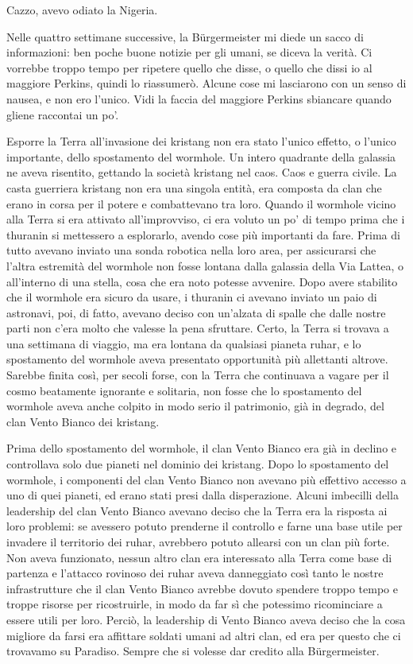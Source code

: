 Cazzo, avevo odiato la Nigeria.

\hfill\break

Nelle quattro settimane successive, la Bürgermeister mi diede un sacco
di informazioni: ben poche buone notizie per gli umani, se diceva la
verità. Ci vorrebbe troppo tempo per ripetere quello che disse, o quello
che dissi io al maggiore Perkins, quindi lo riassumerò. Alcune cose mi
lasciarono con un senso di nausea, e non ero l'unico. Vidi la faccia del
maggiore Perkins sbiancare quando gliene raccontai un po'.

Esporre la Terra all'invasione dei kristang non era stato l'unico
effetto, o l'unico importante, dello spostamento del wormhole. Un intero
quadrante della galassia ne aveva risentito, gettando la società
kristang nel caos. Caos e guerra civile. La casta guerriera kristang non
era una singola entità, era composta da clan che erano in corsa per il
potere e combattevano tra loro. Quando il wormhole vicino alla Terra si
era attivato all'improvviso, ci era voluto un po' di tempo prima che i
thuranin si mettessero a esplorarlo, avendo cose più importanti da fare.
Prima di tutto avevano inviato una sonda robotica nella loro area, per
assicurarsi che l'altra estremità del wormhole non fosse lontana dalla
galassia della Via Lattea, o all'interno di una stella, cosa che era
noto potesse avvenire. Dopo avere stabilito che il wormhole era sicuro
da usare, i thuranin ci avevano inviato un paio di astronavi, poi, di
fatto, avevano deciso con un'alzata di spalle che dalle nostre parti non
c'era molto che valesse la pena sfruttare. Certo, la Terra si trovava a
una settimana di viaggio, ma era lontana da qualsiasi pianeta ruhar, e
lo spostamento del wormhole aveva presentato opportunità più allettanti
altrove. Sarebbe finita così, per secoli forse, con la Terra che
continuava a vagare per il cosmo beatamente ignorante e solitaria, non
fosse che lo spostamento del wormhole aveva anche colpito in modo serio
il patrimonio, già in degrado, del clan Vento Bianco dei kristang.

Prima dello spostamento del wormhole, il clan Vento Bianco era già in
declino e controllava solo due pianeti nel dominio dei kristang. Dopo lo
spostamento del wormhole, i componenti del clan Vento Bianco non avevano
più effettivo accesso a uno di quei pianeti, ed erano stati presi dalla
disperazione. Alcuni imbecilli della leadership del clan Vento Bianco
avevano deciso che la Terra era la risposta ai loro problemi: se
avessero potuto prenderne il controllo e farne una base utile per
invadere il territorio dei ruhar, avrebbero potuto allearsi con un clan
più forte. Non aveva funzionato, nessun altro clan era interessato alla
Terra come base di partenza e l'attacco rovinoso dei ruhar aveva
danneggiato così tanto le nostre infrastrutture che il clan Vento Bianco
avrebbe dovuto spendere troppo tempo e troppe risorse per ricostruirle,
in modo da far sì che potessimo ricominciare a essere utili per loro.
Perciò, la leadership di Vento Bianco aveva deciso che la cosa migliore
da farsi era affittare soldati umani ad altri clan, ed era per questo
che ci trovavamo su Paradiso. Sempre che si volesse dar credito alla
Bürgermeister.

